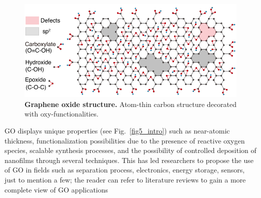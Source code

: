 \begin{figure}
  \centering
  \includegraphics[width=6in]{intro/Fig4.pdf}
  \caption{\textbf{Graphene oxide structure.} Atom-thin carbon structure decorated with oxy-functionalities.}
  \label{fig4_intro}
\end{figure}

GO displays unique properties (see Fig.~\ref{fig5_intro})  such as near-atomic thickness, functionalization possibilities due to the presence of reactive oxygen species,\cite{chen2012graphene} scalable synthesis processes,\cite{akbari2016large}  and the possibility of controlled deposition of nanofilms through several techniques. This has led researchers to propose the use of GO in fields such as separation process,\cite{mi2014graphene} electronics,\cite{eda2008large} energy storage,\cite{le2011graphene} sensors,\cite{drewniak2016studies} just to mention a few; the reader can refer to literature reviews to gain a more complete view of GO applications\cite{georgakilas2016noncovalent,sun2016recent,fathizadeh2017graphene}

